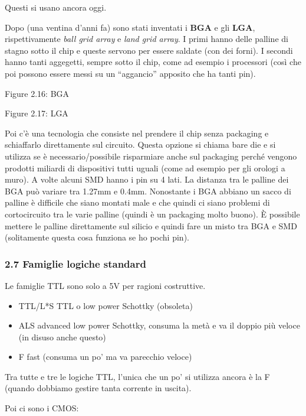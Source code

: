\documentclass[
]{article}
\providecommand{\tightlist}{%
  \setlength{\itemsep}{0pt}\setlength{\parskip}{0pt}}
\begin{document}
Questi si usano ancora oggi.

Dopo (una ventina d'anni fa) sono stati inventati i \textbf{BGA} e gli
\textbf{LGA}, rispettivamente \emph{ball grid array} e \emph{land grid
array}. I primi hanno delle palline di stagno sotto il chip e queste
servono per essere saldate (con dei forni). I secondi hanno tanti
aggegetti, sempre sotto il chip, come ad esempio i processori (così che
poi possono essere messi su un ``aggancio'' apposito che ha tanti pin).

Figure 2.16: BGA

Figure 2.17: LGA

Poi c'è una tecnologia che consiste nel prendere il chip senza packaging
e schiaffarlo direttamente sul circuito. Questa opzione si chiama bare
die e si utilizza se è necessario/possibile risparmiare anche sul
packaging perché vengono prodotti miliardi di dispositivi tutti uguali
(come ad esempio per gli orologi a muro). \newline A volte alcuni SMD
hanno i pin su 4 lati. \newline  La distanza tra le palline dei BGA può
variare tra 1.27mm e 0.4mm. Nonostante i BGA abbiano un sacco di palline
è difficile che siano montati male e che quindi ci siano problemi di
cortocircuito tra le varie palline (quindi è un packaging molto buono).
È possibile mettere le palline direttamente sul silicio e quindi fare un
misto tra BGA e SMD (solitamente questa cosa funziona se ho pochi pin).

\subsubsection{2.7 Famiglie logiche
standard}\label{famiglie-logiche-standard}

Le famiglie TTL sono solo a 5V per ragioni costruttive.

\begin{itemize}
\tightlist
\item
  TTL/L*S TTL o low power Schottky (obsoleta)
\item
  ALS advanced low power Schottky, consuma la metà e va il doppio più
  veloce (in disuso anche questo)
\item
  F fast (consuma un po' ma va parecchio veloce)
\end{itemize}

Tra tutte e tre le logiche TTL, l'unica che un po' si utilizza ancora è
la F (quando dobbiamo gestire tanta corrente in uscita).

Poi ci sono i CMOS:
\end{document}
